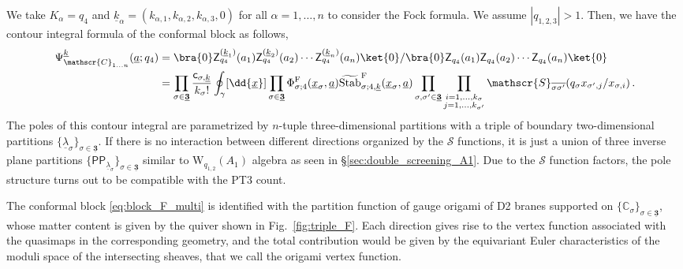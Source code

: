 We take $K_\alpha = q_4$ and $\underline{k}_\alpha = (k_{\alpha,1},k_{\alpha,2},k_{\alpha,3},0)$ for all $\alpha = 1,\ldots,n$ to consider the Fock formula.
We assume $|q_{1,2,3}|>1$.
Then, we have the contour integral formula of the conformal block as follows,
\begin{align}
    \Psi_{\mathscr{C}_{1\ldots n}}^{\underline{k}}(\underline{a};q_4) & = \bra{0} \mathsf{Z}^{(\underline{k}_1)}_{q_4}(a_1) \mathsf{Z}^{(\underline{k}_2)}_{q_4}(a_2) \cdots \mathsf{Z}^{(\underline{k}_n)}_{q_4}(a_n) \ket{0} / \bra{0} \mathsf{Z}_{q_4}(a_1) \mathsf{Z}_{q_4}(a_2) \cdots \mathsf{Z}_{q_4}(a_n) \ket{0}
    \nonumber \\ 
    & = \prod_{\sigma \in \underline{\mathbf{3}}} \frac{\mathsf{c}_{\sigma,\underline{k}}}{k_\sigma!} \oint_\gamma [\dd{\underline{x}}] \prod_{\sigma \in \underline{\mathbf{3}}} \Phi_{\sigma;4}^\text{F}(\underline{x}_\sigma,\underline{a}) \widetilde{\operatorname{Stab}}_{\sigma;4,\underline{k}}^\text{F}(\underline{x}_\sigma,\underline{a}) 
    \prod_{\sigma, \sigma' \in \underline{\mathbf{3}}} \prod_{\substack{i = 1,\ldots,k_\sigma \\ j = 1, \ldots, k_{\sigma'}}} \mathscr{S}_{\overline{\sigma\sigma'}}(q_\sigma x_{\sigma',j}/x_{\sigma,i})
    \, . \label{eq:block_F_multi}
\end{align}
The poles of this contour integral are parametrized by $n$-tuple three-dimensional partitions with a triple of boundary two-dimensional partitions $\{\underline{\lambda}_\sigma\}_{\sigma \in \underline{\mathbf{3}}}$.
If there is no interaction between different directions organized by the $\mathscr{S}$ functions, it is just a union of three inverse plane partitions $\{ \mathsf{PP}_{\underline{\lambda}_\sigma} \}_{\sigma \in \underline{\mathbf{3}}}$ similar to $\mathrm{W}_{q_{1,2}}(A_1)$ algebra as seen in \S\ref{sec:double_screening_A1}.
Due to the $\mathscr{S}$ function factors, the pole structure turns out to be compatible with the PT3 count.

The conformal block \eqref{eq:block_F_multi} is identified with the partition function of gauge origami of D2 branes supported on $\{\mathbb{C}_{\sigma}\}_{\sigma \in \underline{\mathbf{3}}}$, whose matter content is given by the quiver shown in Fig.~\ref{fig:triple_F}.
Each direction gives rise to the vertex function associated with the quasimaps in the corresponding geometry, and the total contribution would be given by the equivariant Euler characteristics of the moduli space of the intersecting sheaves, that we call the origami vertex function.

